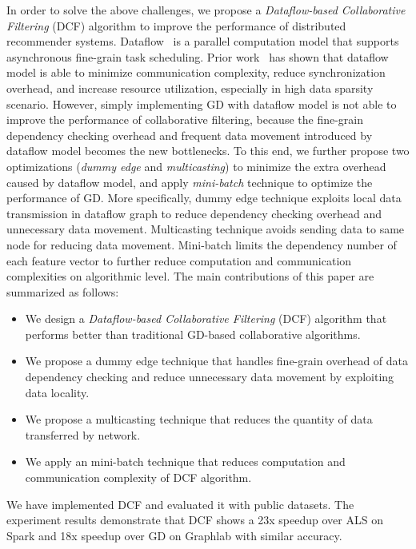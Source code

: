 \documentclass{llncs}
\begin{document}
In order to solve the above challenges, we propose a {\it Dataflow-based Collaborative Filtering} (DCF) algorithm to improve the performance of distributed recommender systems. Dataflow~\cite{dataflow} is a parallel computation model that
supports asynchronous fine-grain task scheduling. Prior work~\cite{codelet} has shown that dataflow model is able to minimize communication complexity, reduce synchronization overhead, and increase resource utilization, especially in high data sparsity scenario. However, simply implementing GD with dataflow model is not able to improve the performance of collaborative filtering, because the fine-grain dependency checking overhead and frequent data movement introduced by dataflow model becomes the new bottlenecks.
To this end, we further propose two optimizations ({\it dummy edge} and {\it multicasting}) to minimize the extra overhead caused by dataflow model, and apply {\it mini-batch} technique to optimize the performance of GD. More specifically, dummy edge technique exploits local data transmission in dataflow graph to reduce dependency checking overhead and unnecessary data movement. Multicasting technique avoids sending data to same node for reducing data movement. Mini-batch limits the dependency number of each feature vector to further reduce computation and communication complexities on algorithmic level. The main contributions of this paper are summarized as follows:

\vspace{-5pt}
\begin{itemize}
\item We design a {\it Dataflow-based Collaborative Filtering} (DCF) algorithm that performs better than traditional GD-based collaborative algorithms.
\item We propose a dummy edge technique that handles fine-grain overhead of data dependency checking and reduce unnecessary data movement by exploiting  data locality.
\item We propose a multicasting technique that reduces the quantity of data transferred by network.
\item We apply an mini-batch technique that reduces computation and communication complexity of DCF algorithm.
\end{itemize}
\vspace{-5pt}

We have implemented DCF and evaluated it with public datasets. The experiment results demonstrate that DCF shows a 23x speedup over ALS on Spark and 18x speedup over GD on Graphlab with similar accuracy.
\end{document}
